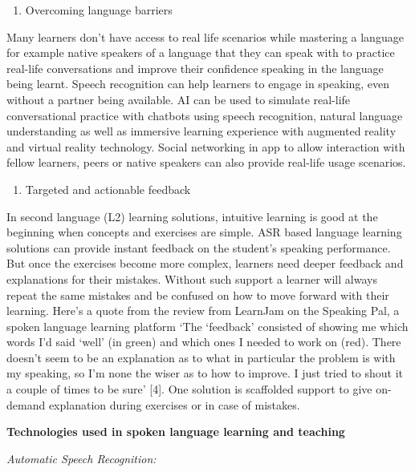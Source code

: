 \documentclass[
]{book}
\providecommand{\tightlist}{%
  \setlength{\itemsep}{0pt}\setlength{\parskip}{0pt}}
\begin{document}
\begin{enumerate}
\def\labelenumi{\arabic{enumi}.}
\setcounter{enumi}{2}
\tightlist
\item
  Overcoming language barriers
\end{enumerate}

Many learners don't have access to real life scenarios while mastering a language for example native speakers of a language that they can speak with to practice real-life conversations and improve their confidence speaking in the language being learnt. Speech recognition can help learners to engage in speaking, even without a partner being available. AI can be used to simulate real-life conversational practice with chatbots using speech recognition, natural language understanding as well as immersive learning experience with augmented reality and virtual reality technology. Social networking in app to allow interaction with fellow learners, peers or native speakers can also provide real-life usage scenarios.

\begin{enumerate}
\def\labelenumi{\arabic{enumi}.}
\setcounter{enumi}{3}
\tightlist
\item
  Targeted and actionable feedback
\end{enumerate}

In second language (L2) learning solutions, intuitive learning is good at the beginning when concepts and exercises are simple. ASR based language learning solutions can provide instant feedback on the student's speaking performance. But once the exercises become more complex, learners need deeper feedback and explanations for their mistakes. Without such support a learner will always repeat the same mistakes and be confused on how to move forward with their learning. Here's a quote from the review from LearnJam on the Speaking Pal, a spoken language learning platform `The `feedback' consisted of showing me which words I'd said `well' (in green) and which ones I needed to work on (red). There doesn't seem to be an explanation as to what in particular the problem is with my speaking, so I'm none the wiser as to how to improve. I just tried to shout it a couple of times to be sure' {[}4{]}. One solution is scaffolded support to give on-demand explanation during exercises or in case of mistakes.

\textbf{Technologies used in spoken language learning and teaching}

\emph{Automatic Speech Recognition:}
\end{document}
